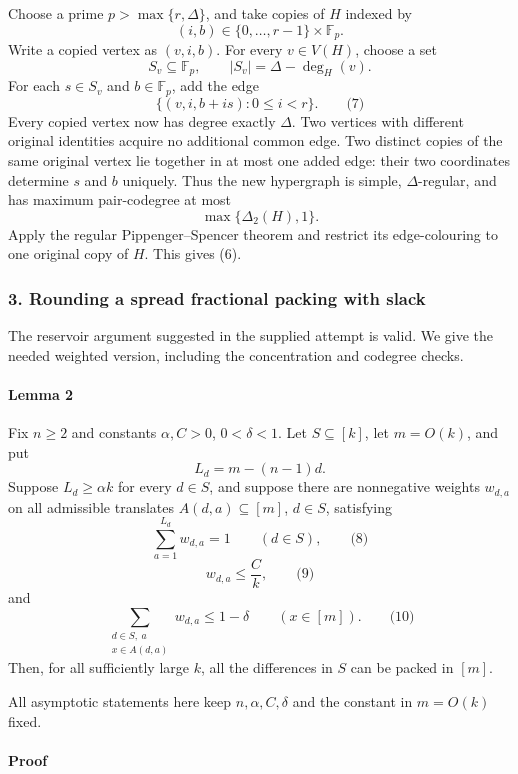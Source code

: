 \documentclass[
  11pt,
  a4paper,
]{article}
\begin{document}
Choose a prime \(p>\max\{r,\Delta\}\), and take copies of \(H\) indexed
by \[
(i,b)\in\{0,\ldots,r-1\}\times\mathbb F_p.
\] Write a copied vertex as \((v,i,b)\). For every \(v\in V(H)\), choose
a set \[
S_v\subseteq\mathbb F_p,
\qquad |S_v|=\Delta-\deg_H(v).
\] For each \(s\in S_v\) and \(b\in\mathbb F_p\), add the edge \[
\{(v,i,b+is):0\le i<r\}.
\qquad\text{(7)}
\] Every copied vertex now has degree exactly \(\Delta\). Two vertices
with different original identities acquire no additional common edge.
Two distinct copies of the same original vertex lie together in at most
one added edge: their two coordinates determine \(s\) and \(b\)
uniquely. Thus the new hypergraph is simple, \(\Delta\)-regular, and has
maximum pair-codegree at most \[
\max\{\Delta_2(H),1\}.
\] Apply the regular Pippenger--Spencer theorem and restrict its
edge-colouring to one original copy of \(H\). This gives (6).

\subsubsection{3. Rounding a spread fractional packing with
slack}\label{rounding-a-spread-fractional-packing-with-slack}

The reservoir argument suggested in the supplied attempt is valid. We
give the needed weighted version, including the concentration and
codegree checks.

\paragraph{Lemma 2}\label{lemma-2}

Fix \(n\ge2\) and constants \(\alpha,C>0\), \(0<\delta<1\). Let
\(S\subseteq[k]\), let \(m=O(k)\), and put \[
L_d=m-(n-1)d.
\] Suppose \(L_d\ge\alpha k\) for every \(d\in S\), and suppose there
are nonnegative weights \(w_{d,a}\) on all admissible translates
\(A(d,a)\subseteq[m]\), \(d\in S\), satisfying \[
\sum_{a=1}^{L_d}w_{d,a}=1
\qquad(d\in S),
\qquad\text{(8)}
\] \[
w_{d,a}\le\frac Ck,
\qquad\text{(9)}
\] and \[
\sum_{\substack{d\in S,\ a\\x\in A(d,a)}}w_{d,a}
\le1-\delta
\qquad(x\in[m]).
\qquad\text{(10)}
\] Then, for all sufficiently large \(k\), all the differences in \(S\)
can be packed in \([m]\).

All asymptotic statements here keep \(n,\alpha,C,\delta\) and the
constant in \(m=O(k)\) fixed.

\paragraph{Proof}\label{proof-1}
\end{document}
